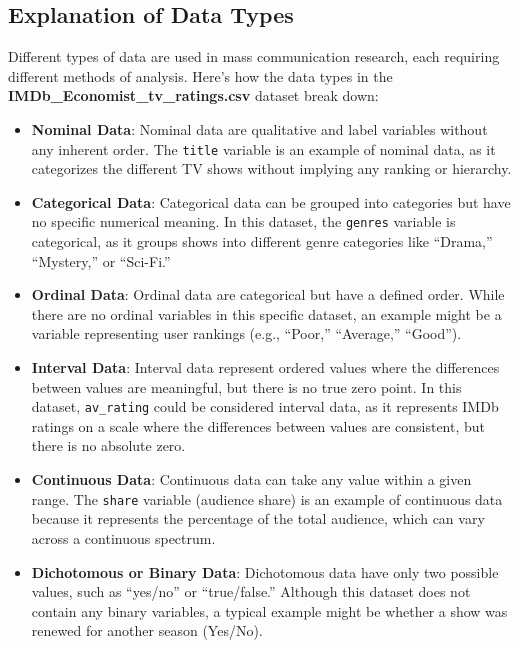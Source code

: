 \documentclass[
]{book}
\begin{document}
\subsection*{Explanation of Data Types}\label{explanation-of-data-types}

Different types of data are used in mass communication research, each requiring different methods of analysis. Here's how the data types in the \textbf{IMDb\_Economist\_tv\_ratings.csv} dataset break down:

\begin{itemize}
\item
  \textbf{Nominal Data}: Nominal data are qualitative and label variables without any inherent order. The \texttt{title} variable is an example of nominal data, as it categorizes the different TV shows without implying any ranking or hierarchy.
\item
  \textbf{Categorical Data}: Categorical data can be grouped into categories but have no specific numerical meaning. In this dataset, the \texttt{genres} variable is categorical, as it groups shows into different genre categories like ``Drama,'' ``Mystery,'' or ``Sci-Fi.''
\item
  \textbf{Ordinal Data}: Ordinal data are categorical but have a defined order. While there are no ordinal variables in this specific dataset, an example might be a variable representing user rankings (e.g., ``Poor,'' ``Average,'' ``Good'').
\item
  \textbf{Interval Data}: Interval data represent ordered values where the differences between values are meaningful, but there is no true zero point. In this dataset, \texttt{av\_rating} could be considered interval data, as it represents IMDb ratings on a scale where the differences between values are consistent, but there is no absolute zero.
\item
  \textbf{Continuous Data}: Continuous data can take any value within a given range. The \texttt{share} variable (audience share) is an example of continuous data because it represents the percentage of the total audience, which can vary across a continuous spectrum.
\item
  \textbf{Dichotomous or Binary Data}: Dichotomous data have only two possible values, such as ``yes/no'' or ``true/false.'' Although this dataset does not contain any binary variables, a typical example might be whether a show was renewed for another season (Yes/No).
\end{itemize}
\end{document}
